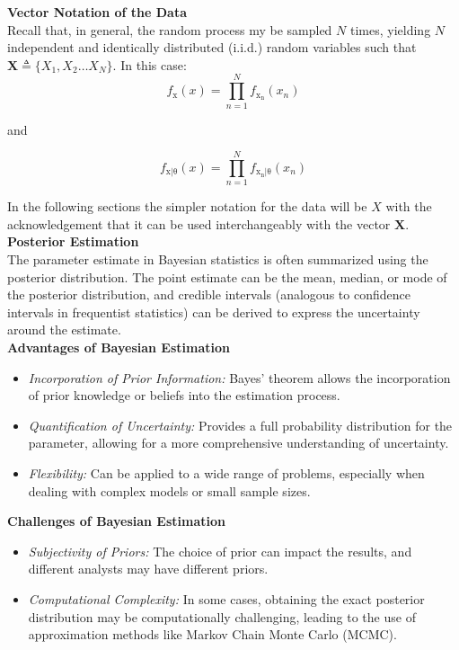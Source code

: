 \documentclass[12pt]{book}
\theoremstyle{definition}
\begin{document}
\textbf{Vector Notation of the Data}\\
Recall that, in general, the random process my be sampled \(N\) times, yielding \(N\) independent and identically distributed (i.i.d.) random variables such that \(\mathbf{X} \triangleq \{X_1, X_2 \ldots X_N\}\). In this case:
\[
f_\mathrm{x}({x}) = \prod_{n=1}^N f_\mathrm{x_n}(x_n)
\]

and

\[
f_\mathrm{{x}|\theta}({x}) = \prod_{n=1}^N f_\mathrm{x_n|\theta}(x_n)
\]

In the following sections the simpler notation for the data will be \(X\) with the acknowledgement that it can be used interchangeably with the vector \(\mathbf{X}\).\\

\textbf{Posterior Estimation}\\ The parameter estimate in Bayesian statistics is often summarized using the posterior distribution. The point estimate can be the mean, median, or mode of the posterior distribution, and credible intervals (analogous to confidence intervals in frequentist statistics) can be derived to express the uncertainty around the estimate.\\

\textbf{Advantages of Bayesian Estimation}
\begin{itemize}
    \item \emph{Incorporation of Prior Information:} Bayes' theorem allows the incorporation of prior knowledge or beliefs into the estimation process.
    \item \emph{Quantification of Uncertainty:} Provides a full probability distribution for the parameter, allowing for a more comprehensive understanding of uncertainty.
    \item \emph{Flexibility:} Can be applied to a wide range of problems, especially when dealing with complex models or small sample sizes.
\end{itemize}

\textbf{Challenges of Bayesian Estimation}
\begin{itemize}
    \item \emph{Subjectivity of Priors:} The choice of prior can impact the results, and different analysts may have different priors.
    \item \emph{Computational Complexity:} In some cases, obtaining the exact posterior distribution may be computationally challenging, leading to the use of approximation methods like Markov Chain Monte Carlo (MCMC).
\end{itemize}
\end{document}
